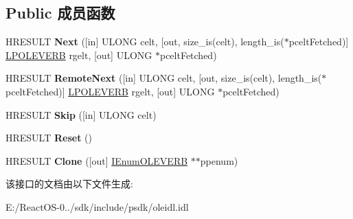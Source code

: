 \subsection*{Public 成员函数}
\begin{DoxyCompactItemize}
\item 
\mbox{\label{interface_i_enum_o_l_e_v_e_r_b_a76bc2af5b68c02d9ce5c3f77214287b7}} 
H\+R\+E\+S\+U\+LT {\bfseries Next} (\mbox{[}in\mbox{]} U\+L\+O\+NG celt, \mbox{[}out, size\+\_\+is(celt), length\+\_\+is($\ast$pcelt\+Fetched)\mbox{]} \hyperlink{struct_i_enum_o_l_e_v_e_r_b_1_1tag_o_l_e_v_e_r_b}{L\+P\+O\+L\+E\+V\+E\+RB} rgelt, \mbox{[}out\mbox{]} U\+L\+O\+NG $\ast$pcelt\+Fetched)
\item 
\mbox{\label{interface_i_enum_o_l_e_v_e_r_b_ab44bb37c9e6cf9978804b465ed0fdc91}} 
H\+R\+E\+S\+U\+LT {\bfseries Remote\+Next} (\mbox{[}in\mbox{]} U\+L\+O\+NG celt, \mbox{[}out, size\+\_\+is(celt), length\+\_\+is($\ast$pcelt\+Fetched)\mbox{]} \hyperlink{struct_i_enum_o_l_e_v_e_r_b_1_1tag_o_l_e_v_e_r_b}{L\+P\+O\+L\+E\+V\+E\+RB} rgelt, \mbox{[}out\mbox{]} U\+L\+O\+NG $\ast$pcelt\+Fetched)
\item 
\mbox{\label{interface_i_enum_o_l_e_v_e_r_b_a4ef1c93dec959f4841df23295022a2a4}} 
H\+R\+E\+S\+U\+LT {\bfseries Skip} (\mbox{[}in\mbox{]} U\+L\+O\+NG celt)
\item 
\mbox{\label{interface_i_enum_o_l_e_v_e_r_b_a3d1a9f28c7cc8fd4d136ad5bb7be9f22}} 
H\+R\+E\+S\+U\+LT {\bfseries Reset} ()
\item 
\mbox{\label{interface_i_enum_o_l_e_v_e_r_b_aa575c03b09ac3bced89a09cce097beff}} 
H\+R\+E\+S\+U\+LT {\bfseries Clone} (\mbox{[}out\mbox{]} \hyperlink{interface_i_enum_o_l_e_v_e_r_b}{I\+Enum\+O\+L\+E\+V\+E\+RB} $\ast$$\ast$ppenum)
\end{DoxyCompactItemize}


该接口的文档由以下文件生成\+:\begin{DoxyCompactItemize}
\item 
E\+:/\+React\+O\+S-\/0../sdk/include/psdk/oleidl.\+idl\end{DoxyCompactItemize}
